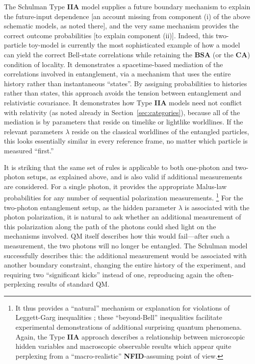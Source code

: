 \documentclass[onecolumn, nofootinbib, 12pt]{revtex4-1}
\begin{document}
The Schulman Type {\bf IIA} model supplies a future boundary mechanism to explain the future-input dependence [an account missing from component (i) of the above schematic models, as noted there], and the very same mechanism provides the correct outcome probabilities [to explain component (ii)].  Indeed, this two-particle toy-model is currently the most sophisticated example of how a model can yield the correct Bell-state correlations while retaining the {\bf BSA} (or the {\bf CA}) condition of locality. It demonstrates a spacetime-based mediation of the correlations involved in entanglement, via a mechanism that uses the entire history rather than instantaneous ``states''.  By assigning probabilities to histories rather than states, this approach avoids the tension between entanglement and relativistic covariance.  It demonstrates how Type {\bf IIA} models need not conflict with relativity (as noted already in Section~\ref{sec:categories}), because all of the mediation is by parameters that reside on timelike or lightlike worldlines. If the relevant parameters $\lambda$ reside on the classical worldlines of the entangled particles, this looks essentially similar in every reference frame, no matter which particle is measured ``first.''

It is striking that the same set of rules is applicable to both one-photon and two-photon setups, as explained above, and is also valid if additional measurements are considered.  For a single photon, it provides the appropriate Malus-law probabilities for any number of sequential polarization measurements.%
\footnote{It thus provides a ``natural'' mechanism or explanation for violations of Leggett-Garg inequalities \cite{leggett1985}; these ``beyond-Bell'' inequalities facilitate experimental demonstrations of additional surprising quantum phenomena.  Again, the Type {\bf IIA} approach describes a relationship between microscopic hidden variables and macroscopic observable results which appear quite perplexing from a ``macro-realistic'' {\bf NFID}-assuming point of view.}
For the two-photon entanglement setup, as the hidden parameter $\lambda$ is associated with the photon polarization, it is natural to ask whether an additional measurement of this polarization along the path of the photons could shed light on the mechanisms involved.  QM itself describes how this would fail---after such a measurement, the two photons will no longer be entangled.  The Schulman model successfully describes this: the additional measurement would be associated with another boundary constraint, changing the entire history of the experiment, and requiring two ``significant kicks'' instead of one, reproducing again the often-perplexing results of standard QM\@.
\end{document}
